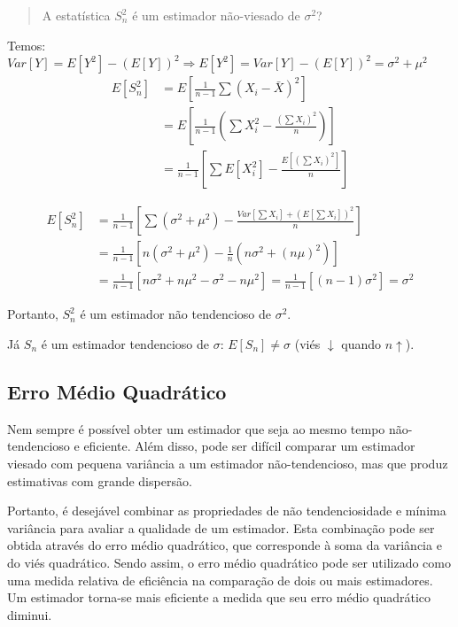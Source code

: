 \documentclass[
]{book}
\theoremstyle{definition}
\theoremstyle{definition}
\theoremstyle{definition}
\theoremstyle{remark}
\begin{document}
\begin{quote}
A estatística \(S_n^2\) é um estimador não-viesado de \(\sigma^2\)?
\end{quote}

Temos: \(Var[Y] = E[Y^2] - (E[Y])^2 \Rightarrow E[Y^2] = Var[Y] - (E[Y])^2 = \sigma^2 + \mu^2\)
\begin{align*}
  E[S_n^2] 
  &= E\left[\frac{1}{n-1}\sum (X_i - \bar{X})^2\right]\\ 
  &= E\left[\frac{1}{n-1}\left(\sum X_i^2 - \frac{(\sum X_i)^2}{n}\right)\right]\\
  &= \frac{1}{n-1}\left[ \sum E[X_i^2] - \frac{E[(\sum X_i)^2]}{n} \right]
\end{align*}

\begin{align*}
  E[S_n^2] 
  &= \frac{1}{n-1}\left[ \sum (\sigma^2 + \mu^2) - \frac{Var[\sum X_i] + (E[\sum X_i])^2}{n}  \right]\\ 
   &= \frac{1}{n-1}\left[n(\sigma^2 + \mu^2) - \frac{1}{n} (n\sigma^2 + (n\mu)^2) \right]\\
  &= \frac{1}{n-1}\left[ n\sigma^2 + n\mu^2 - \sigma^2 - n\mu^2 \right] = \frac{1}{n-1}\left[(n-1)\sigma^2 \right] = \sigma^2
\end{align*}

Portanto, \(S_n^2\) é um estimador não tendencioso de \(\sigma^2\).

Já \(S_n\) é um estimador tendencioso de \(\sigma\): \(E[S_n] \neq \sigma\) (viés \(\downarrow\) quando \(n \uparrow\)).

\hypertarget{erro-muxe9dio-quadruxe1tico}{%
\subsection*{Erro Médio Quadrático}\label{erro-muxe9dio-quadruxe1tico}}

Nem sempre é possível obter um estimador que seja ao mesmo tempo não-tendencioso e eficiente. Além disso, pode ser difícil comparar um estimador viesado com pequena variância a um estimador não-tendencioso, mas que produz estimativas com grande dispersão.

Portanto, é desejável combinar as propriedades de não tendenciosidade e mínima variância para avaliar a qualidade de um estimador. Esta combinação pode ser obtida através do erro médio quadrático, que corresponde à soma da variância e do viés quadrático. Sendo assim, o erro médio quadrático pode ser utilizado como uma medida relativa de eficiência na comparação de dois ou mais estimadores. Um estimador torna-se mais eficiente a medida que seu erro médio quadrático diminui.
\end{document}
